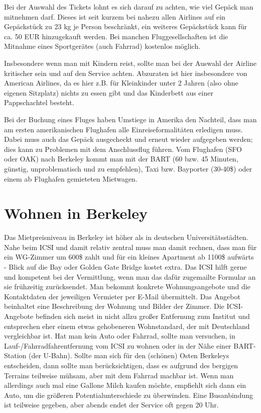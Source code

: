 \documentclass[a4paper]{scrreprt}
\begin{document}
Bei der Auswahl des Tickets lohnt es sich darauf zu achten, wie viel Gepäck man mitnehmen darf. Dieses ist seit kurzem bei nahezu allen Airlines auf ein Gepäckstück zu 23 kg je Person beschränkt, ein weiteres Gepäckstück kann für ca. 50 EUR hinzugekauft werden. Bei manchen Fluggesellschaften ist die Mitnahme eines Sportgerätes (auch Fahrrad) kostenlos möglich.

Insbesondere wenn man mit Kindern reist, sollte man bei der Auswahl der Airline kritischer sein und auf den Service achten. Abzuraten ist hier insbesondere von American Airlines, da es hier z.B. für Kleinkinder unter 2 Jahren (also ohne eigenen Sitzplatz) nichts zu essen gibt und das Kinderbett aus einer Pappschachtel besteht.

Bei der Buchung eines Fluges haben Umstiege in Amerika den Nachteil, dass man am ersten amerikanischen Flughafen alle Einreiseformalitäten erledigen muss. Dabei muss auch das Gepäck ausgecheckt und erneut wieder aufgegeben werden; dies kann zu Problemen mit dem Anschlussflug führen. Vom Flughafen (SFO oder OAK) nach Berkeley kommt man mit der BART (60 bzw. 45 Minuten, günstig, unproblematisch und zu empfehlen), Taxi bzw. Bayporter (30-40\$) oder einem ab Flughafen gemieteten Mietwagen.
 
\section{Wohnen in Berkeley}

Das Mietpreisniveau in Berkeley ist höher als in deutschen Universitätsstädten. Nahe beim ICSI und damit relativ
zentral muss man damit rechnen, dass man für ein WG-Zimmer um 600\$ zahlt und für ein kleines Apartment ab 1100\$ aufwärts - Blick auf die Bay oder Golden Gate Bridge kostet extra. Das ICSI hilft gerne und kompetent bei der Vermittlung, wenn man das dafür zugemailte Formular an sie frühzeitig zurücksendet. Man bekommt konkrete Wohnungsangebote und die Kontaktdaten der jeweiligen Vermieter per E-Mail übermittelt. Das Angebot beinhaltet eine Beschreibung der Wohnung und Bilder der Zimmer. Die ICSI-Angebote befinden sich meist in nicht allzu großer Entfernung zum Institut und entsprechen eher einem etwas gehobeneren Wohnstandard, der mit Deutschland vergleichbar ist. Hat man kein Auto oder Fahrrad, sollte man versuchen, in Lauf-/Fahrradfahrentfernung vom ICSI zu wohnen oder in der Nähe einer BART-Station (der U-Bahn). Sollte man sich für den (schönen) Osten Berkeleys entscheiden, dann sollte man berücksichtigen, dass es aufgrund des bergigen Terrains teilweise mühsam, aber mit dem Fahrrad machbar ist. Wenn man allerdings auch mal eine Gallone Milch kaufen möchte, empfiehlt sich dann ein Auto, um die größeren Potentialunterschiede zu überwinden. Eine Busanbindung ist teilweise gegeben, aber abends endet der Service oft gegen 20 Uhr.
\end{document}
